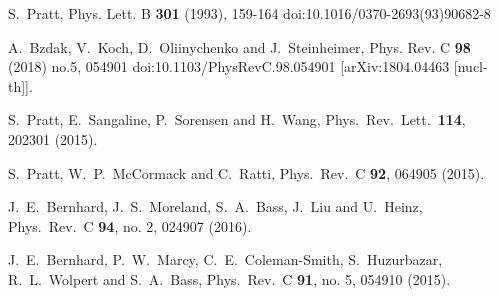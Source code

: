 \begin{thebibliography}{99}
S.~Pratt,
Phys. Lett. B \textbf{301} (1993), 159-164
doi:10.1016/0370-2693(93)90682-8

A.~Bzdak, V.~Koch, D.~Oliinychenko and J.~Steinheimer,
Phys. Rev. C \textbf{98} (2018) no.5, 054901
doi:10.1103/PhysRevC.98.054901
[arXiv:1804.04463 [nucl-th]].














  S.~Pratt, E.~Sangaline, P.~Sorensen and H.~Wang,
  Phys.\ Rev.\ Lett.\  {\bf 114}, 202301 (2015).
  
	
  S.~Pratt, W.~P.~McCormack and C.~Ratti,
  Phys.\ Rev.\ C {\bf 92}, 064905 (2015).
  
  J.~E.~Bernhard, J.~S.~Moreland, S.~A.~Bass, J.~Liu and U.~Heinz,
  Phys.\ Rev.\ C {\bf 94}, no. 2, 024907 (2016).
  
  J.~E.~Bernhard, P.~W.~Marcy, C.~E.~Coleman-Smith, S.~Huzurbazar, R.~L.~Wolpert and S.~A.~Bass,
  Phys.\ Rev.\ C {\bf 91}, no. 5, 054910 (2015).


\end{thebibliography}
